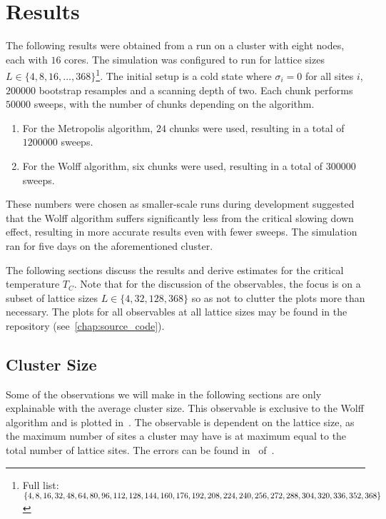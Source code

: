 \chapter{Results}
	The following results were obtained from a run on a cluster with eight nodes, each with $16$ cores. The simulation was configured to run for lattice sizes $L \in \{4, 8, 16, \dots, 368\}$\footnote{Full list: $\{4, 8, 16, 32, 48, 64, 80, 96, 112, 128, 144, 160, 176, 192, 208, 224, 240, 256, 272, 288, 304, 320,\\336, 352, 368\}$}. The initial setup is a cold state where $\sigma_i = 0$ for all sites $i$, $\num{200000}$ bootstrap resamples and a scanning depth of two. Each chunk performs $\num{50000}$ sweeps, with the number of chunks depending on the algorithm.
	\begin{enumerate}
		\item For the Metropolis algorithm, $\num{24}$ chunks were used, resulting in a total of $\num{1200000}$ sweeps.
		\item For the Wolff algorithm, six chunks were used, resulting in a total of $\num{300000}$ sweeps.
	\end{enumerate}
	These numbers were chosen as smaller-scale runs during development suggested that the Wolff algorithm suffers significantly less from the critical slowing down effect, resulting in more accurate results even with fewer sweeps. The simulation ran for five days on the aforementioned cluster.
	
	The following sections discuss the results and derive estimates for the critical temperature $T_C$. Note that for the discussion of the observables, the focus is on a subset of lattice sizes $L \in \{4, 32, 128, 368\}$ so as not to clutter the plots more than necessary. The plots for all observables at all lattice sizes may be found in the repository (see~\cref{chap:source_code}).
	
	\section{Cluster Size}\label{sec:res:cluster_size}
		Some of the observations we will make in the following sections are only explainable with the average cluster size. This observable is exclusive to the Wolff algorithm and is plotted in~. The observable is dependent on the lattice size, as the maximum number of sites a cluster may have is at maximum equal to the total number of lattice sites.
		The errors can be found in~ of~.
		
